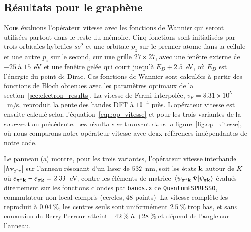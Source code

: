 \subsection{Résultats pour le graphène}

Nous évaluons l'opérateur vitesse avec les fonctions de Wannier qui seront utilisées partout dans le reste du mémoire. Cinq fonctions sont initialisées par trois orbitales hybrides $sp^2$ et une orbitale $p_z$ sur le premier atome dans la cellule et une autre $p_z$ sur le second, sur une grille $27\times 27$, avec une fenêtre externe de $-25$ à $15$~eV et une fenêtre gelée qui court jusqu'à $E_D+2.5$~eV, où $E_D$ est l'énergie du point de Dirac. Ces fonctions de Wannier sont calculées à partir des fonctions de Bloch obtenues avec les paramètres optimaux de la section~\ref{sec:electron_results}. La vitesse de Fermi interpolée, $v_F=8.31\times 10^{5}$~m/s, reproduit la pente des bandes DFT à $10^{-4}$ près. L'opérateur vitesse est ensuite calculé selon l'équation~\eqref{eqn:op_vitesse} et pour les trois variantes de la sous-section précédente. Les résultats se trouvent dans la figure~\ref{fig:op_vitesse}, où nous comparons notre opérateur vitesse avec deux références indépendantes de notre code.

Le panneau (a) montre, pour les trois variantes, l'opérateur vitesse interbande $|\hbar \bm v_{\pi^*\pi}|$ sur l'anneau résonant d'un laser de $532$~nm, soit les états $\mathbf{k}$ autour de $K$ où $\varepsilon_{\pi^*\mathbf{k}}-\varepsilon_{\pi\mathbf{k}}=2.33$~eV, contre les éléments de matrice $\matrixel{\psi_{\pi^*\kv}}{\hat{\mathbf{v}}}{\psi_{\pi\kv}}$ évalués directement sur les fonctions d'ondes par \texttt{bands.x} de \texttt{QuantumESPRESSO}, commutateur non local compris (cercles, 48 points). La vitesse complète les reproduit à $0.04~\%$, les centres seuls sont uniformément $2.5~\%$ trop bas, et sans connexion de Berry l'erreur atteint $-42~\%$ à $+28~\%$ et dépend de l'angle sur l'anneau.

